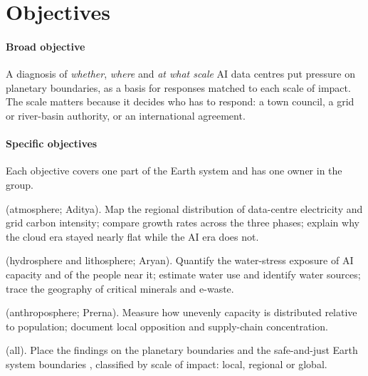 \section{Objectives}\label{sec:objectives}

\paragraph{Broad objective} A diagnosis of \emph{whether}, \emph{where} and \emph{at what scale} AI data centres put
pressure on planetary boundaries, as a basis for responses matched to each scale of impact. The scale matters because
it decides who has to respond: a town council, a grid or river-basin authority, or an international agreement.

\paragraph{Specific objectives} Each objective covers one part of the Earth system and has one owner in the group.
\begin{description}[leftmargin=0pt,labelsep=0.4em,itemsep=1.5pt]
\item[O1 Energy and carbon] (atmosphere; Aditya). Map the regional distribution of data-centre electricity and grid
carbon intensity; compare growth rates across the three phases; explain why the cloud era stayed nearly flat while the
AI era does not.
\item[O2 Materials, water and waste] (hydrosphere and lithosphere; Aryan). Quantify the water-stress exposure of AI
capacity and of the people near it; estimate water use and identify water sources; trace the geography of critical
minerals and e-waste.
\item[O3 Economy, politics and society] (anthroposphere; Prerna). Measure how unevenly capacity is distributed
relative to population; document local opposition and supply-chain concentration.
\item[O4 Synthesis] (all). Place the findings on the planetary boundaries \citep{sakschewski2025} and the
safe-and-just Earth system boundaries \citep{rockstrom2023}, classified by scale of impact: local, regional or
global.
\end{description}
